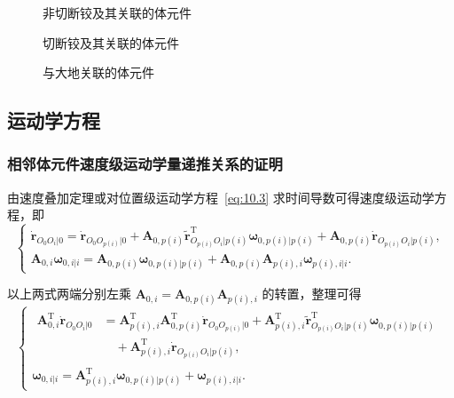 \begin{figure}[htbp]
\centering
\caption{非切断铰及其关联的体元件}
\label{fig:11.2}
\end{figure}

\begin{figure}[htbp]
\centering
\caption{切断铰及其关联的体元件}
\label{fig:11.3}
\end{figure}

\begin{figure}[htbp]
\centering
\caption{与大地关联的体元件}
\label{fig:11.4}
\end{figure}

\subsection{运动学方程}

\subsubsection{相邻体元件速度级运动学量递推关系的证明}

由速度叠加定理或对位置级运动学方程~\eqref{eq:10.3} 求时间导数可得速度级运动学方程，即
\begin{equation}\label{eq:11.40}
\begin{cases}
\dot{\boldsymbol{r}}_{O_0O_i|0} = \dot{\boldsymbol{r}}_{O_0O_{p(i)}|0} + \boldsymbol{A}_{0,p(i)} \tilde{\boldsymbol{r}}_{O_{p(i)}O_i|p(i)}^{\mathrm{T}} \boldsymbol{\omega}_{0,p(i)|p(i)} + \boldsymbol{A}_{0,p(i)} \dot{\boldsymbol{r}}_{O_{p(i)}O_i|p(i)}, \\[8pt]
\boldsymbol{A}_{0,i} \boldsymbol{\omega}_{0,i|i} = \boldsymbol{A}_{0,p(i)} \boldsymbol{\omega}_{0,p(i)|p(i)} + \boldsymbol{A}_{0,p(i)} \boldsymbol{A}_{p(i),i} \boldsymbol{\omega}_{p(i),i|i}.
\end{cases}
\end{equation}

以上两式两端分别左乘 $\boldsymbol{A}_{0,i} = \boldsymbol{A}_{0,p(i)} \boldsymbol{A}_{p(i),i}$ 的转置，整理可得
\begin{equation}\label{eq:11.41}
\begin{cases}
\begin{aligned}
\boldsymbol{A}_{0,i}^{\mathrm{T}} \dot{\boldsymbol{r}}_{O_0O_i|0} &= \boldsymbol{A}_{p(i),i}^{\mathrm{T}} \boldsymbol{A}_{0,p(i)}^{\mathrm{T}} \dot{\boldsymbol{r}}_{O_0O_{p(i)}|0}
   + \boldsymbol{A}_{p(i),i}^{\mathrm{T}} \tilde{\boldsymbol{r}}_{O_{p(i)}O_i|p(i)}^{\mathrm{T}} \boldsymbol{\omega}_{0,p(i)|p(i)} \\
   &\quad + \boldsymbol{A}_{p(i),i}^{\mathrm{T}} \dot{\boldsymbol{r}}_{O_{p(i)}O_i|p(i)},
\end{aligned} \\[12pt]
\boldsymbol{\omega}_{0,i|i} = \boldsymbol{A}_{p(i),i}^{\mathrm{T}} \boldsymbol{\omega}_{0,p(i)|p(i)} + \boldsymbol{\omega}_{p(i),i|i}.
\end{cases}
\end{equation}

